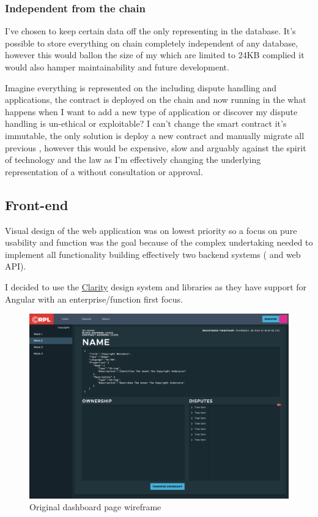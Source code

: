 \subsubsection{Independent from the chain}

I've chosen to keep certain data off the  only representing in the database. It's possible to store everything on chain completely independent of any database, however this would ballon the size of my  which are limited to 24KB complied it would also hamper maintainability and future development.

Imagine everything is represented on the  including dispute handling and applications, the contract is deployed on the chain and now running in the  what happens when I want to add a new type of application or discover my dispute handling is un-ethical or exploitable? I can't change the smart contract it's immutable, the only solution is deploy a new contract and manually migrate all previous , however this would be expensive, slow and arguably against the spirit of  technology and the law as I'm effectively changing the underlying representation of a  without consultation or approval.

\subsection{Front-end}

Visual design of the web application was on lowest priority so a focus on pure usability and function was the goal because of the complex undertaking needed to implement all functionality building effectively two backend systems ( and web API).

I decided to use the \href{https://clarity.design/}{Clarity} design system and libraries as they have support for Angular with an enterprise/function first focus.

\begin{figure}[H]
\caption{Original dashboard page wireframe}
\centering
\includegraphics[width=\textwidth,height=0.5\textheight,keepaspectratio]{images/wireframe/Dashboard}
\end{figure}

